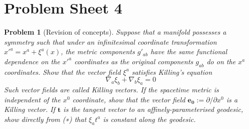 \documentclass[a4paper]{article}
\theoremstyle{new2}
\theoremstyle{new}
\newtheorem{qns}{Problem}[section]
\begin{document}
\section{Problem Sheet 4}
\begin{qns}[Revision of concepts]
Suppose that a manifold possesses a symmetry such that under an infinitesimal coordinate transformation $x'^a=x^a+\xi^a(x)$, the metric components $g'_{ab}$ have the same functional dependence on the $x'^a$ coordinates as the original components $g_{ab}$ do on the $x^a$ coordinates. Show that the vector field $\xi^a$ satisfies Killing’s equation
\begin{equation}
    \nabla_a\xi_b+\nabla_b\xi_a=0\tag{*}
\end{equation}
Such vector fields are called Killing vectors. If the spacetime metric is independent of the $x^0$ coordinate, show that the vector field $\mathbf{e_0}:=\partial/\partial x^0$ is a Killing vector. If $\mathbf{t}$ is the tangent vector to an affinely-parameterised geodesic, show directly from (∗) that $\xi_a t^a$ is constant along the geodesic.
\end{qns}
\end{document}
